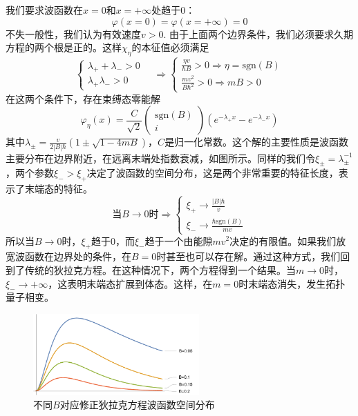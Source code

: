 \documentclass{article}
\numberwithin{equation}{subsection}
\begin{document}
我们要求波函数在$x=0$和$x=+\infty$处趋于$0$：
\begin{equation}
    \varphi(x=0)=\varphi(x=+\infty)=0
\end{equation}
不失一般性，我们认为有效速度$v>0$. 由于上面两个边界条件，我们必须要求久期方程的两个根是正的。这样$\chi_\eta$的本征值必须满足
\begin{equation}
    \begin{cases}
        \lambda_++\lambda_->0\\
        \lambda_+\lambda_->0
    \end{cases}\quad\Longrightarrow\begin{cases}
        \frac{\eta v}{\hbar B}>0\Longrightarrow\eta=\mathrm{sgn}(B)\\
        \frac{mv^2}{B\hbar^2}>0\Longrightarrow mB>0
    \end{cases}
\end{equation}
在这两个条件下，存在束缚态零能解
\begin{equation}
    \varphi_\eta(x)=\frac{C}{\sqrt{2}}\begin{pmatrix}
        \mathrm{sgn}(B)\\
        i
    \end{pmatrix}(e^{-\lambda_+x}-e^{-\lambda_-x})
\end{equation}
其中$\lambda_{\pm}=\frac{v}{2|B|\hbar}(1\pm\sqrt{1-4mB})$，$C$是归一化常数。这个解的主要性质是波函数主要分布在边界附近，在远离末端处指数衰减，如图所示。同样的我们令$\xi_\pm=\lambda_\pm^{-1}$，两个参数$\xi_->\xi_+$决定了波函数的空间分布，这是两个非常重要的特征长度，表示了末端态的特征。
\begin{equation}
    \text{当}B\to0\text{时}\Longrightarrow\begin{cases}
        \xi_+\to\frac{|B|\hbar}{v}\\
        \xi_-\to\frac{\hbar\mathrm{sgn}(B)}{mv}
    \end{cases}
\end{equation}
所以当$B\to0$时，$\xi_+$趋于$0$，而$\xi_-$趋于一个由能隙$mv^2$决定的有限值。如果我们放宽波函数在边界处的条件，在$B=0$时甚至也可以存在解。通过这种方式，我们回到了传统的狄拉克方程。在这种情况下，两个方程得到一个结果。当$m\to0$时，$\xi_-\to+\infty$，这表明末端态扩展到体态。这样，在$m=0$时末端态消失，发生拓扑量子相变。

\begin{figure}[h]
    \centering
    \includegraphics[width=2.5in]{dirac4.pdf}
    \caption{不同$B$对应修正狄拉克方程波函数空间分布}\label{dirac pic 4}
\end{figure}
\end{document}
